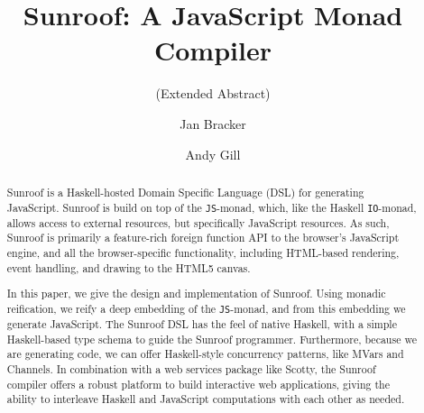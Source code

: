 \documentclass{llncs}
\newcommand{\Src}[1]{{\tt{#1}}}
\newcommand{\IO}{\Src{IO}}
\newcommand{\JS}{\Src{JS}}
\begin{document}
%
\title{Sunroof: A JavaScript Monad Compiler}
\subtitle{(Extended Abstract)}
%
%
\author{Jan Bracker  \and Andy Gill}
%
%
%


\maketitle              %

\begin{abstract}
Sunroof is a Haskell-hosted Domain Specific Language (DSL) for generating JavaScript.
Sunroof is build on top of the \JS-monad, which, like the Haskell \IO-monad, allows 
access to external resources, but specifically JavaScript
resources. As such, Sunroof is primarily a feature-rich foreign
function API to the browser's JavaScript engine, and all the browser-specific
functionality, including HTML-based rendering, event handling, and 
drawing to the HTML5 canvas. 

In this paper, we give the design and implementation of Sunroof.
Using monadic reification, we reify a deep embedding of the \JS-monad,
and from this embedding we generate JavaScript.
The Sunroof DSL has the feel of native Haskell, with a simple
Haskell-based type schema to guide the Sunroof programmer.
Furthermore, because we are generating code,
we can offer Haskell-style concurrency patterns, like MVars and Channels.
In combination with a web services package like Scotty,
the Sunroof compiler offers a robust platform to build interactive web applications,
giving the ability to interleave Haskell and JavaScript computations
with each other as needed.
\end{abstract}
\end{document}
